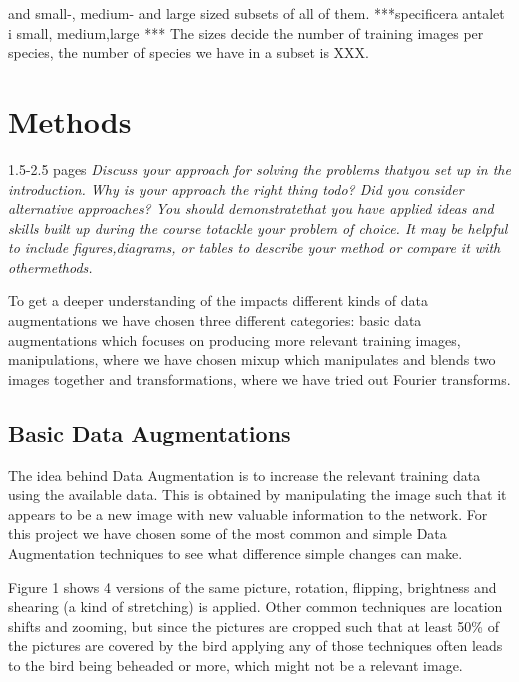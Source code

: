 \documentclass{article}
\begin{document}
and small-, medium- and large sized subsets of all of them.
***specificera antalet i small, medium,large ***
The sizes decide the number of training images per species, the number of species we have in a subset is XXX.
 

\section{Methods}

1.5-2.5 pages
\textit{Discuss your approach for solving the problems thatyou set up in the introduction. Why is your approach the right thing todo? Did you consider alternative approaches? You should demonstratethat you have applied ideas and skills built up during the course totackle  your  problem  of  choice.   It  may  be  helpful  to  include  figures,diagrams, or tables to describe your method or compare it with othermethods.}

To get a deeper understanding of the impacts different kinds of data augmentations we have chosen three different categories: basic data augmentations which focuses on producing more relevant training images, manipulations, where we have chosen mixup which manipulates and blends two images together and transformations, where we have tried out Fourier transforms. 

\subsection{Basic Data Augmentations}
The idea behind Data Augmentation is to increase the relevant training data using the available data. This is obtained by manipulating the image such that it appears to be a new image with new valuable information to the network. For this project we have chosen some of the most common and simple Data Augmentation techniques to see what difference simple changes can make.

Figure 1 shows 4 versions of the same picture, rotation, flipping, brightness and shearing (a kind of stretching) is applied. Other common techniques are location shifts and zooming, but since the pictures are cropped such that at least 50\% of the pictures are covered by the bird applying any of those techniques often leads to the bird being beheaded  or more, which might not be a relevant image.
\end{document}
